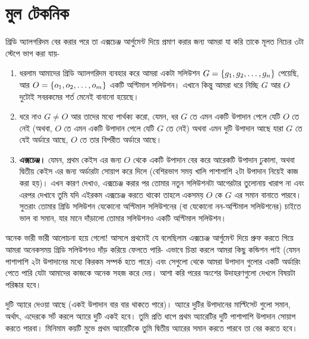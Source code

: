 \section{মুল টেকনিক}

গ্রিডি অ্যালগরিদম বের করার পরে তা এক্সচেঞ্জ আর্গুমেন্ট দিয়ে প্রমাণ করার জন্য আমরা যা করি তাকে মূলত নিচের ৩টা স্টেপে ভাগ করা যায়-
\begin{enumerate}
	\item ধরলাম আমাদের গ্রিডি অ্যালগরিদম ব্যবহার করে আমরা একটা সলিউশন $G = \left \{ g_1, g_2, \ldots, g_n \right \}$ পেয়েছি, আর $O = \left \{ o_1, o_2, \ldots, o_m \right \}$ একটি অপ্টিমাল সলিউশন।  এখানে কিন্তু আমরা ধরে নিচ্ছি $G$ আর $O$ দুটোই সবরকমের শর্ত মেনেই বানানো হয়েছে।
	\item ধরে নাও $G \not= O$ আর  তাদের মধ্যে পার্থক্য করো, যেমন, ধর $G$ তে এমন একটি উপাদান পেলে যেটি $O$ তে নেই (অথবা, $O$ তে এমন একটি উপাদান পেলে যেটি $G$ তে নেই) অথবা এমন দুটি উপাদান আছে যারা $G$ তে যেই অর্ডারে আছে, $O$ তে তার বিপরীত অর্ডারে আছে।
	\item \textbf{এক্সচেঞ্জ।} যেমন, প্রথম কেইস এর জন্য $O$ থেকে একটি উপাদান বের করে আরেকটি উপাদান ঢুকালা, অথবা দ্বিতীয় কেইস এর জন্য অর্ডারটা সোয়াপ করে দিলে (বেশিরভাগ সময় খালি পাশাপাশি ২টা উপাদান নিয়েই কাজ করা হয়)। এখন কারণ দেখাও, এক্সচেঞ্জ করার পর তোমার নতুন সলিউশনটা আগেরটার তুলোনায় খারাপ না এবং এরপর দেখাবে তুমি যদি এইরকম এক্সচেঞ্জ করতে থাকো তাহলে একসময় $O$ কে $G$ এর সমান বানাতে পারবে। সুতরাং তোমার গ্রিডি সলিউশন যেকোনো অপ্টিমাল সলিউশনের (বা যেকোনো নন-অপ্টিমাল সলিউশনের) চাইতে ভাল বা সমান, যার মানে দাঁড়ালো তোমার সলিউশনও একটি অপ্টিমাল সলিউশন।
\end{enumerate}

অনেক ভারী ভারী আলোচনা হয়ে গেলো! আসলে প্রথমেই যে বলেছিলাম এক্সচেঞ্জ আর্গুমেন্ট দিয়ে প্রুফ করতে গিয়ে আমরা অনেকসময় গ্রিডি সলিউশনও দাঁড় করিয়ে ফেলতে পারি- এভাবে চিন্তা করলে আমরা কিছু কন্ডিশন পাই (যেমন পাশাপাশি ২টা উপাদানের মধ্যে কিরকম সম্পর্ক হতে পারে) এবং সেগুলো থেকে আমরা উপাদান গুলোর একটি অর্ডারিং পেতে পারি যেটা আমাদের কাজকে অনেক সহজ করে দেয়। আশা করি পরের অংশের উদাহরণগুলো দেখলে বিষয়টা পরিষ্কার হবে।

\begin{diybox}
\begin{problem}
দুটি অ্যারে দেওয়া আছে (একই উপাদান বার বার থাকতে পারে)। অ্যারে দুটির উপাদানের মাল্টিসেট গুলো সমান, অর্থাৎ, এদেরকে সর্ট করলে অ্যারে দুটি একই হবে। তুমি প্রতি ধাপে প্রথম অ্যারেটির দুটি পাশাপাশি উপাদান সোয়াপ করতে পারবা। মিনিমাম কয়টি মুভে প্রথম অ্যারেটিকে তুমি দ্বিতীয় অ্যারের সমান করতে পারবে তা বের করতে হবে।
\end{problem}
\end{diybox}


